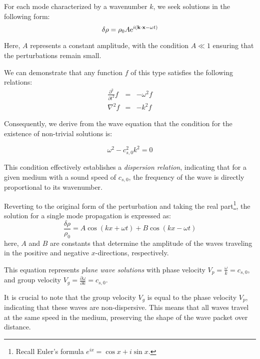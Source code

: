 For each mode characterized by a wavenumber \( k \), we seek solutions in the following form:
%
\begin{equation}
\delta \rho = \rho_0 A {\rm e}^{i(\vb k \cdot \vb x - \omega t)}
\end{equation}

Here, \( A \) represents a constant amplitude, with the condition \( A \ll 1 \) ensuring that the perturbations remain small.

We can demonstrate that any function \( f \) of this type satisfies the following relations:
%
\begin{eqnarray}
\frac{\partial^2}{\partial t^2} f & = & - \omega^2 f \\
\nabla^2 f & = & -k^2 f
\end{eqnarray}

Consequently, we derive from the wave equation that the condition for the existence of non-trivial solutions is:
%
\begin{remark}
\begin{equation}
\omega^2 - c_{s,0}^2 k^2 = 0
\end{equation}
\end{remark}

This condition effectively establishes a \emph{dispersion relation}, indicating that for a given medium with a sound speed of \( c_{s,0} \), the frequency of the wave is directly proportional to its wavenumber. 

Reverting to the original form of the perturbation and taking the real part\footnote{Recall Euler's formula \( e^{ix} = \cos x + i \sin x \).}, the solution for a single mode propagation is expressed as:
%
\begin{equation}\label{eq:rhowaveform}
\frac{\delta \rho}{\rho_0} = A \cos(kx + \omega t) + B \cos(kx - \omega t) 
\end{equation}
%
here, \( A \) and \( B \) are constants that determine the amplitude of the waves traveling in the positive and negative \( x \)-directions, respectively.

This equation represents \emph{plane wave solutions} with phase velocity \( V_p = \frac{\omega}{k} = c_{s,0} \), and group velocity \( V_g = \frac{\partial \omega}{\partial k} = c_{s,0} \).

It is crucial to note that the group velocity \( V_g \) is equal to the phase velocity \( V_p \), indicating that these waves are non-dispersive. This means that all waves travel at the same speed in the medium, preserving the shape of the wave packet over distance.

